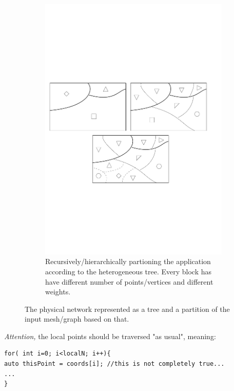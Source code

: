\documentclass[a4paper,10pt]{article}
\begin{document}
\begin{figure}
 \begin{subfigure}{\textwidth}
    \centering
	\includegraphics[scale=0.7]{heterog_tree_part}
	\caption{Recursively/hierarchically partioning the application according to the heterogeneous 
	tree. Every block has have different number of points/vertices and different weights.}
	\label{fig:heterog_part}
 \end{subfigure}
 \caption{ The physical network represented as a tree and a partition of the input mesh/graph 
 based on that.}
 \label{fig:heterog}
\end{figure}

\emph{Attention,} the local points should be traversed "as usual", meaning:
\begin{verbatim}
for( int i=0; i<localN; i++){
auto thisPoint = coords[i]; //this is not completely true...
...
}
\end{verbatim}
\end{document}
